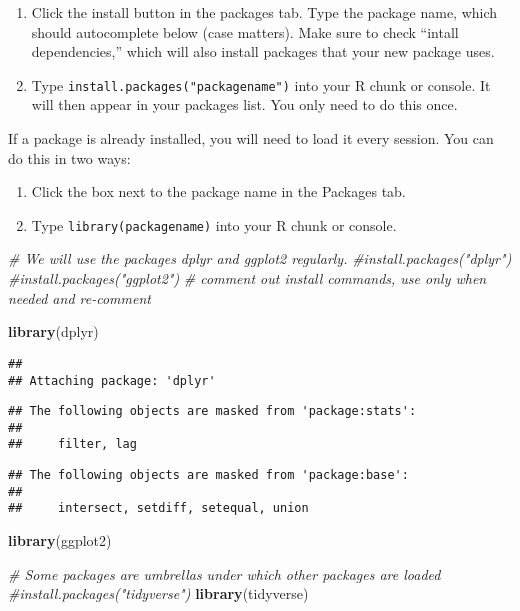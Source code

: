 \documentclass[
]{article}
\newenvironment{Shaded}{\begin{snugshade}}{\end{snugshade}}
\newcommand{\CommentTok}[1]{\textcolor[rgb]{0.56,0.35,0.01}{\textit{#1}}}
\newcommand{\KeywordTok}[1]{\textcolor[rgb]{0.13,0.29,0.53}{\textbf{#1}}}
\newcommand{\NormalTok}[1]{#1}
\begin{document}
\begin{enumerate}
\def\labelenumi{\arabic{enumi}.}
\item
  Click the install button in the packages tab. Type the package name,
  which should autocomplete below (case matters). Make sure to check
  ``intall dependencies,'' which will also install packages that your
  new package uses.
\item
  Type \texttt{install.packages("packagename")} into your R chunk or
  console. It will then appear in your packages list. You only need to
  do this once.
\end{enumerate}

If a package is already installed, you will need to load it every
session. You can do this in two ways:

\begin{enumerate}
\def\labelenumi{\arabic{enumi}.}
\item
  Click the box next to the package name in the Packages tab.
\item
  Type \texttt{library(packagename)} into your R chunk or console.
\end{enumerate}

\begin{Shaded}
\begin{Highlighting}[]
\CommentTok{# We will use the packages dplyr and ggplot2 regularly. }
\CommentTok{#install.packages("dplyr") }
\CommentTok{#install.packages("ggplot2")}
\CommentTok{# comment out install commands, use only when needed and re-comment}

\KeywordTok{library}\NormalTok{(dplyr)}
\end{Highlighting}
\end{Shaded}

\begin{verbatim}
## 
## Attaching package: 'dplyr'
\end{verbatim}

\begin{verbatim}
## The following objects are masked from 'package:stats':
## 
##     filter, lag
\end{verbatim}

\begin{verbatim}
## The following objects are masked from 'package:base':
## 
##     intersect, setdiff, setequal, union
\end{verbatim}

\begin{Shaded}
\begin{Highlighting}[]
\KeywordTok{library}\NormalTok{(ggplot2)}

\CommentTok{# Some packages are umbrellas under which other packages are loaded}
\CommentTok{#install.packages("tidyverse")}
\KeywordTok{library}\NormalTok{(tidyverse)}
\end{Highlighting}
\end{Shaded}
\end{document}
